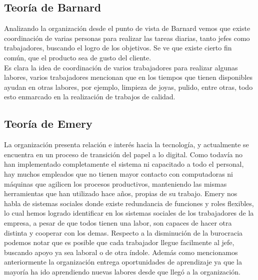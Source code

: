 
\subsection{Teoría de Barnard}
	Analizando la organización desde el punto de vista de Barnard vemos que existe coordinación de varias personas
	para realizar las tareas diarias, tanto jefes como trabajadores, buscando el logro de los objetivos. Se ve
	que existe cierto fin común, que el producto sea de gusto del cliente.\\

	Es clara la idea de coordinación de varios trabajadores para realizar algunas labores, varios
	trabajadores mencionan que en los tiempos que tienen disponibles ayudan en otras labores, por ejemplo,
	limpieza de joyas, pulido, entre otras, todo esto enmarcado en la realización de trabajos de calidad.

\subsection{Teoría de Emery}
	La organización presenta relación e interés hacia la tecnología, y actualmente se encuentra en un
	proceso de transición del papel a lo digital. Como todavía no han implementado completamente el
	sistema ni capacitado a todo el personal, hay muchos empleados que no tienen mayor contacto con
	computadoras ni máquinas que agilicen los procesos productivos, manteniendo las mismas
	herramientas que han utilizado hace años, propias de su trabajo. Emery nos habla de sistemas sociales donde
	existe redundancia de funciones y roles flexibles, lo cual hemos logrado identificar en los
	sistemas sociales de los trabajadores de la empresa, a pesar de que todos tienen una labor, son
	capaces de hacer otra distinta y cooperar con los demas. Respecto a la disminución de la
	burocracia podemos notar que es posible que cada trabajador llegue facilmente al jefe, buscando
	apoyo ya sea laboral o de otra índole. Además como mencionamos anteriormente la organización
	entrega oportunidades de aprendizaje ya que la mayoría ha ido
	aprendiendo nuevas labores desde que llegó a la organización.\\

